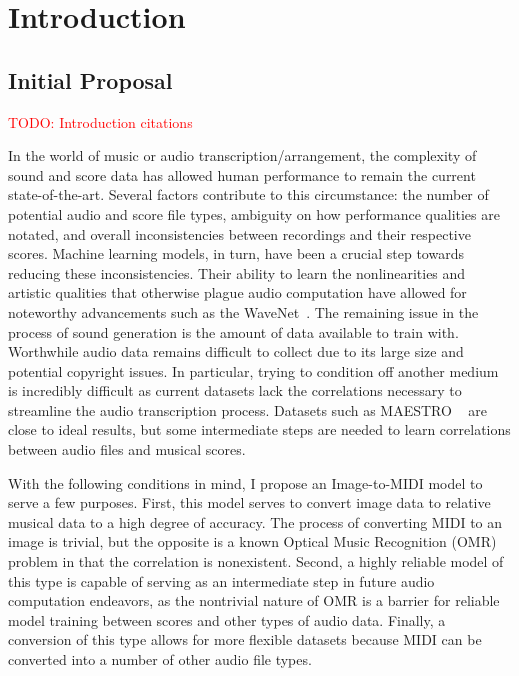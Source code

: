 \documentclass[review,sigconf]{acmart}
\newcommand{\todo}[1]{\textcolor{red}{TODO: #1}}
\begin{document}
\maketitle

\section{Introduction}
\subsection{Initial Proposal}
\todo{Introduction citations}
\cite{andrea2021note}

In the world of music or audio transcription/arrangement, the complexity of sound and score data has allowed human performance to remain the current state-of-the-art. 
Several factors contribute to this circumstance: the number of potential audio and score file types, ambiguity on how performance qualities are notated, and overall inconsistencies between recordings and their respective scores. 
Machine learning models, in turn, have been a crucial step towards reducing these inconsistencies. 
Their ability to learn the nonlinearities and artistic qualities that otherwise plague audio computation have allowed for noteworthy advancements such as the WaveNet~\cite{oord2016wavenet}. 
The remaining issue in the process of sound generation is the amount of data available to train with. 
Worthwhile audio data remains difficult to collect due to its large size and potential copyright issues. 
In particular, trying to condition off another medium is incredibly difficult as current datasets lack the correlations necessary to streamline the audio transcription process. 
Datasets such as MAESTRO ~\cite{hawthorne2018enabling} are close to ideal results, but some intermediate steps are needed to learn correlations between audio files and musical scores.

With the following conditions in mind, I propose an Image-to-MIDI model to serve a few purposes. First, this model serves to convert image data to relative musical data to a high degree of accuracy. The process of converting MIDI to an image is trivial, but the opposite is a known Optical Music Recognition (OMR) problem in that the correlation is nonexistent. 
Second, a highly reliable model of this type is capable of serving as an intermediate step in future audio computation endeavors, as the nontrivial nature of OMR is a barrier for reliable model training between scores and other types of audio data. 
Finally, a conversion of this type allows for more flexible datasets because MIDI can be converted into a number of other audio file types.
\end{document}
